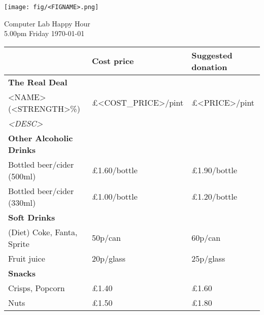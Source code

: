 \documentclass[a4paper,12pt]{article}
\begin{document}
\thispagestyle{empty}

\begin{center}
	\texttt{[image: fig/<FIGNAME>.png]} \par \bigskip \bigskip \bigskip
    {\Large Computer Lab Happy Hour} \\ \smallskip
    {5.00pm Friday \today}
\end{center}

\bigskip

\large
\begin{center}

\def\arraystretch{1.1}

\begin{tabular}{p{7.5cm}|p{3cm}|p{3cm}} & \textbf{Cost price} & \textbf{Suggested donation} \\
\hline
\textbf{The Real Deal} & & \\
<NAME> (<STRENGTH>\%) & \pounds <COST_PRICE>/pint & \pounds <PRICE>/pint \\
\small \it <DESC> \medskip & & \\

\hline
{\bf Other Alcoholic Drinks} & & \\
Bottled beer/cider (500ml) & \pounds 1.60/bottle & \pounds 1.90/bottle \\
Bottled beer/cider (330ml) & \pounds 1.00/bottle & \pounds 1.20/bottle \medskip \\

\hline
{\bf Soft Drinks} &&\\
(Diet) Coke, Fanta, Sprite & 50p/can  & 60p/can \\
Fruit juice & 20p/glass & 25p/glass \medskip \\

\hline
{\bf Snacks} & & \\
Crisps, Popcorn &\pounds 1.40 &\pounds 1.60 \\
Nuts &\pounds 1.50 &\pounds 1.80 \\

\end{tabular}
\end{center}
\end{document}
